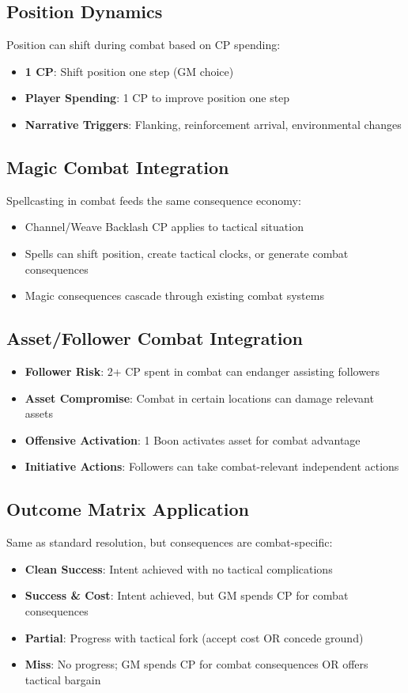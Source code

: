 \documentclass[11pt]{article}
\begin{document}
\subsection{Position Dynamics}
Position can shift during combat based on CP spending:
\begin{itemize}
    \item \textbf{1 CP}: Shift position one step (GM choice)
    \item \textbf{Player Spending}: 1 CP to improve position one step
    \item \textbf{Narrative Triggers}: Flanking, reinforcement arrival, environmental changes
\end{itemize}

\subsection{Magic Combat Integration}
Spellcasting in combat feeds the same consequence economy:
\begin{itemize}
    \item Channel/Weave Backlash CP applies to tactical situation
    \item Spells can shift position, create tactical clocks, or generate combat consequences
    \item Magic consequences cascade through existing combat systems
\end{itemize}

\subsection{Asset/Follower Combat Integration}
\begin{itemize}
    \item \textbf{Follower Risk}: 2+ CP spent in combat can endanger assisting followers
    \item \textbf{Asset Compromise}: Combat in certain locations can damage relevant assets  
    \item \textbf{Offensive Activation}: 1 Boon activates asset for combat advantage
    \item \textbf{Initiative Actions}: Followers can take combat-relevant independent actions
\end{itemize}

\subsection{Outcome Matrix Application}
Same as standard resolution, but consequences are combat-specific:
\begin{itemize}
    \item \textbf{Clean Success}: Intent achieved with no tactical complications
    \item \textbf{Success \& Cost}: Intent achieved, but GM spends CP for combat consequences
    \item \textbf{Partial}: Progress with tactical fork (accept cost OR concede ground)
    \item \textbf{Miss}: No progress; GM spends CP for combat consequences OR offers tactical bargain
\end{itemize}
\end{document}
